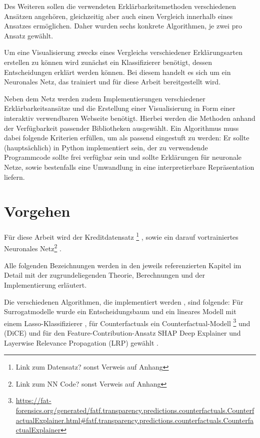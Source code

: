 Des Weiteren sollen die verwendeten Erklärbarkeitsmethoden verschiedenen Ansätzen angehören, gleichzeitig aber auch einen Vergleich innerhalb eines Ansatzes ermöglichen. Daher wurden sechs konkrete Algorithmen, je zwei pro Ansatz gewählt.


Um eine Visualisierung zwecks eines Vergleichs verschiedener Erklärungsarten erstellen zu können wird zunächst ein Klassifizierer benötigt, dessen Entscheidungen erklärt werden können. Bei diesem handelt es sich um ein Neuronales Netz, das trainiert und für diese Arbeit bereitgestellt wird.


Neben dem Netz werden zudem Implementierungen verschiedener Erklärbarkeitsansätze und die Erstellung einer Visualisierung in Form einer interaktiv verwendbaren Webseite benötigt. Hierbei werden die Methoden anhand der Verfügbarkeit passender Bibliotheken ausgewählt. Ein Algorithmus muss dabei folgende Kriterien erfüllen, um als passend eingestuft zu werden: Er sollte (hauptsächlich) in Python implementiert sein, der zu verwendende Programmcode sollte frei verfügbar sein und sollte Erklärungen für neuronale Netze, sowie bestenfalls eine Umwandlung in eine interpretierbare Repräsentation liefern. 


\section{Vorgehen}
\label{section: Vorgehen}
Für diese Arbeit wird der Kreditdatensatz \cite{Referenz Datensatz Paper?} \footnote{Link zum Datensatz? sonst Verweis auf Anhang} , sowie ein darauf vortrainiertes Neuronales Netz\footnote{Link zum NN Code? sonst Verweis auf Anhang} .

Alle folgenden Bezeichnungen werden in den jeweils referenzierten Kapitel im Detail mit der zugrundeliegenden Theorie, Berechnungen und der Implementierung erläutert. 

Die verschiedenen Algorithmen, die implementiert werden , sind folgende: Für Surrogatmodelle wurde ein Entscheidungsbaum \cite{FrosstDecisionTree, BozDecisionTrees, ChenDecisionTrees} und ein lineares Modell mit einem Lasso-Klassifizierer \cite{ISLRBuchLinear}, für Counterfactuals ein Counterfactual-Modell \footnote{\url{https://fat-forensics.org/generated/fatf.transparency.predictions.counterfactuals.CounterfactualExplainer.html\#fatf.transparency.predictions.counterfactuals.CounterfactualExplainer}} \cite{SmithCounterfactuals, WachterCounterfactuals, GoyalCounterfactuals} und (DiCE)\cite{MothilalDiCE} und für den Feature-Contribution-Ansatz SHAP Deep Explainer \cite{LundbergSHAPDeepExplainer} und Layerwise Relevance Propagation (LRP) gewählt \cite{MontavonLRP, BachPixelwise}.

